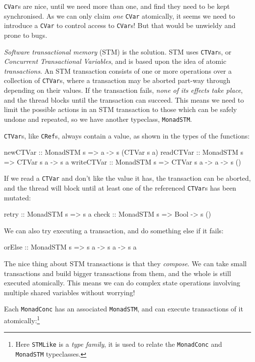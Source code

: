 \verb|CVar|s are nice, until we need more than one, and find they need
to be kept synchronised. As we can only claim \emph{one} \verb|CVar|
atomically, it seems we need to introduce a \verb|CVar| to control
access to \verb|CVar|s! But that would be unwieldy and prone to bugs.

\emph{Software transactional memory} (STM) \citep{stm} is the
solution. STM uses \verb|CTVar|s, or \emph{Concurrent Transactional
  Variables}, and is based upon the idea of atomic
\emph{transactions}. An STM transaction consists of one or more
operations over a collection of \verb|CTVar|s, where a transaction may
be aborted part-way through depending on their values. If the
transaction fails, \emph{none of its effects take place}, and the
thread blocks until the transaction can succeed. This means we need to
limit the possible actions in an STM transaction to those which can be
safely undone and repeated, so we have another typeclass,
\verb|MonadSTM|.

\verb|CTVar|s, like \verb|CRef|s, always contain a value, as shown in
the types of the functions:

\begin{haskellcode}
newCTVar   :: MonadSTM s => a -> s (CTVar s a)
readCTVar  :: MonadSTM s => CTVar s a -> s a
writeCTVar :: MonadSTM s => CTVar s a -> a -> s ()
\end{haskellcode}

If we read a \verb|CTVar| and don't like the value it has, the
transaction can be aborted, and the thread will block until at least
one of the referenced \verb|CTVar|s has been mutated:

\begin{haskellcode}
retry :: MonadSTM s => s a
check :: MonadSTM s => Bool -> s ()
\end{haskellcode}

We can also try executing a transaction, and do something else if it
fails:

\begin{haskellcode}
orElse :: MonadSTM s => s a -> s a -> s a
\end{haskellcode}

The nice thing about STM transactions is that they \emph{compose}. We
can take small transactions and build bigger transactions from them,
and the whole is still executed atomically. This means we can do
complex state operations involving multiple shared variables without
worrying!

Each \verb|MonadConc| has an associated \verb|MonadSTM|, and can
execute transactions of it atomically:\footnote{Here \texttt{STMLike}
  is a \emph{type family}, it is used to relate the \texttt{MonadConc}
  and \texttt{MonadSTM} typeclasses.}


